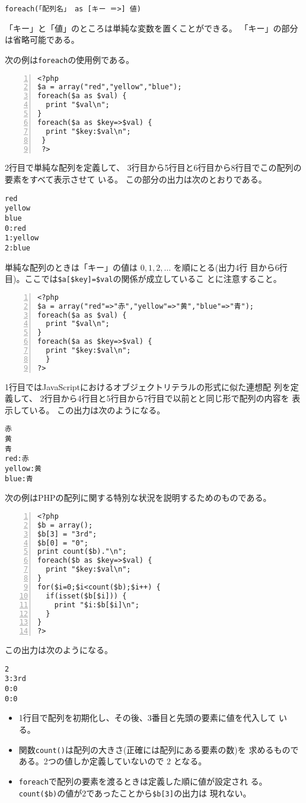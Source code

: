\texttt{foreach(「配列名」 as [キー ＝>] 値)}

「キー」と「値」のところは単純な変数を置くことができる。
「キー」の部分は省略可能である。
\begin{Exec}\upshape
 次の例は\texttt{foreach}の使用例である。
\begin{Verbatim}[numbers=left]
 <?php
$a = array("red","yellow","blue");
foreach($a as $val) {
  print "$val\n";
}
foreach($a as $key=>$val) {
  print "$key:$val\n";
 }
 ?>
\end{Verbatim}
 2行目で単純な配列を定義して、
 3行目から5行目と6行目から8行目でこの配列の要素をすべて表示させて
       いる。
この部分の出力は次のとおりである。
\begin{verbatim}
red
yellow
blue
0:red
1:yellow
2:blue
\end{verbatim}
 単純な配列のときは「キー」の値は $0,1,2,\dots$ を順にとる(出力4行
       目から6行目)。ここでは\Verb+$a[$key]=$val+の関係が成立しているこ
       とに注意すること。
 \begin{Verbatim}[numbers=left]
<?php
$a = array("red"=>"赤","yellow"=>"黄","blue"=>"青");
foreach($a as $val) {
  print "$val\n";
}
foreach($a as $key=>$val) {
  print "$key:$val\n";
  }
?>
\end{Verbatim}
 1行目ではJavaScriptにおけるオブジェクトリテラルの形式に似た連想配
       列を定義して、 2行目から4行目と5行目から7行目で以前とと同じ形で配列の内容を
       表示している。
この出力は次のようになる。
\begin{Verbatim}
赤
黄
青
red:赤
yellow:黄
blue:青
\end{Verbatim}
\end{Exec}%
\begin{Exec}\upshape
次の例はPHPの配列に関する特別な状況を説明するためのものである。
\begin{Verbatim}[numbers=left]
<?php
$b = array();
$b[3] = "3rd";
$b[0] = "0";
print count($b)."\n";
foreach($b as $key=>$val) {
  print "$key:$val\n";
}
for($i=0;$i<count($b);$i++) {
  if(isset($b[$i])) {
    print "$i:$b[$i]\n";
  }
}
?>
\end{Verbatim}
この出力は次のようになる。%
\begin{Verbatim}
2
3:3rd
0:0
0:0
\end{Verbatim}
\begin{itemize}\upshape
 \item 1行目で配列を初期化し、その後、$3$番目と先頭の要素に値を代入して
       いる。
 \item 関数\texttt{count()}は配列の大きさ(正確には配列にある要素の数)を
       求めるものである。2つの値しか定義していないので $2$ となる。
 \item \texttt{foreach}で配列の要素を渡るときは定義した順に値が設定され
       る。\Verb+count($b)+の値が$2$であったことから\Verb+$b[3]+の出力は
       現れない。
\end{itemize}
 \end{Exec}
